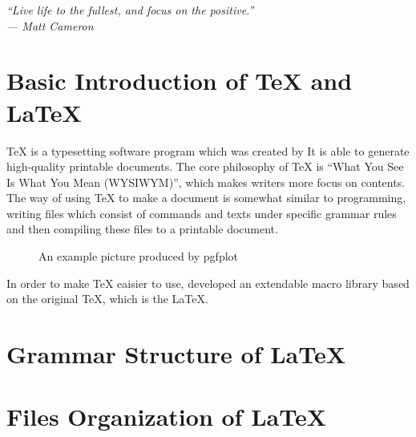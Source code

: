 
{   \itshape \large 
    \raggedleft
    ``Live life to the fullest, and focus on the positive.'' \\
    --- Matt Cameron \\
}
\section{Basic Introduction of \TeX{} and \LaTeX}

\TeX{} is a typesetting software program which was created by  
It is able to generate high-quality printable documents. The core philosophy of 
\TeX{} is ``What You See Is What You Mean (WYSIWYM)'', which makes writers more 
focus on contents. The way of using \TeX{} to make a document is somewhat similar
to programming, writing files which consist of commands and texts under 
specific grammar rules and then compiling these files to a printable document.

\begin{figure}[!htbp]
    \centering
    \caption{An example picture produced by pgfplot}
    \label{fig:pgfplot}  
\end{figure}

In order to make \TeX{} eaisier to use,  developed an extendable macro 
library based on the original \TeX{}, which is the \LaTeX.



\section{Grammar Structure of \LaTeX}



\section{Files Organization of \LaTeX}




